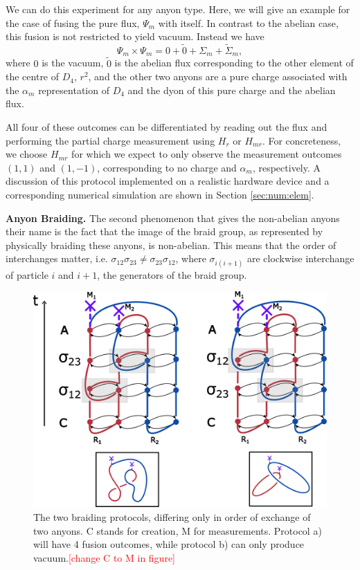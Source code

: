 \documentclass[two column]{article}
\newcommand{\caro}[1]{\textcolor{red}{[#1]}}
\begin{document}
We can do this experiment for any anyon type. Here, we will give an example for the case of fusing the pure flux, $\Psi_m$ with itself. In contrast to the abelian case, this fusion is not restricted to yield vacuum. Instead we have
$$\Psi_m \times \Psi_m = 0 + \tilde{0} + \Sigma_m + \tilde{\Sigma}_m,$$ where $0$ is the vacuum, $\tilde{0}$ is the abelian flux corresponding to the other element of the centre of $D_4$, $r^2$, and the other two anyons are a pure charge associated with the $\alpha_m$ representation of $D_4$ and the dyon of this pure charge and the abelian flux.

All four of these outcomes can be differentiated by reading out the flux and performing the partial charge measurement using $H_r$ or $H_{mr}$. For concreteness, we choose $H_{mr}$ for which we expect to only observe the measurement outcomes $(1,1)$ and $(1,-1)$, corresponding to no charge and $\alpha_m$, respectively. A discussion of this protocol implemented on a realistic hardware device and a corresponding numerical simulation are shown in Section \ref{sec:num:elem}.



\textbf{Anyon Braiding.} The second phenomenon that gives the non-abelian anyons their name is the fact that the image of the braid group, as represented by physically braiding these anyons, is non-abelian. 
This means that the order of interchanges matter, i.e. $\sigma_{12}\sigma_{23} \neq \sigma_{23}\sigma_{12}$, where $\sigma_{i(i+1)}$ are clockwise interchange of particle $i$ and $i+1$, the generators of the braid group.


\begin{figure}
    \centering
    \includegraphics[width=\linewidth]{Figures/fluxBRAID.pdf}
    \caption{The two braiding protocols, differing only in order of exchange of two anyons. C stands for creation, M for measurements. Protocol a) will have 4 fusion outcomes, while protocol b) can only produce vacuum.\caro{change C to M in figure}}
    \label{fig:flux_braid}
\end{figure}
\end{document}
